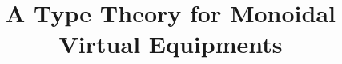\documentclass{article}
\begin{document}
\newcommand{\equalizeVofWbyXeqYatZ}[5]{\{ {#1} : {#2} \pipe {#3} = {#4} : {#5} \}}

\newcommand{\paramPresheaf}[1]{\mathcal P^{#1}}
\newcommand{\pmPresheaf}{\paramPresheaf\pm}
\newcommand{\posPresheaf}{\paramPresheaf+}
\newcommand{\negPresheaf}{\paramPresheaf-}
\newcommand{\negPresheafAppPtoX}[2]{#2\in #1}
\newcommand{\posPresheafAppPtoX}[2]{#1 \ni #2}
\newcommand{\negPresheafApp}{\negPresheafAppPtoX}
\newcommand{\posPresheafApp}{\posPresheafAppPtoX}

\newcommand{\graphProf}[3]{\sum_{{#1};{#2}} #3}

\newcommand{\algCtx}{\textrm{Ctx}}
\newcommand{\algSubst}{\textrm{Subst}}
\newcommand{\algTy}{\textrm{Type}}
\newcommand{\algTm}{\textrm{Term}}
\newcommand{\algCat}{\textrm{Cat}}
\newcommand{\algVarr}{\textrm{Functor}}
\newcommand{\algHCtx}{\textrm{ProfCtx}}
\newcommand{\algHSubst}{\textrm{ProfSubst}}
\newcommand{\algHarr}{\textrm{Prof}}
\newcommand{\algTrans}{\textrm{Trans}}
\newcommand{\algElts}{\textrm{Elts}}
\newcommand{\algEltsI}{\textrm{EltsI}}

\newcommand{\algLHom}{\textrm{LHom}}
\newcommand{\algLHomI}{\textrm{LHomI}}
\newcommand{\algLHomE}{\textrm{LHomE}}
\newcommand{\algRHom}{\textrm{RHom}}
\newcommand{\algRHomI}{\textrm{RHomI}}
\newcommand{\algRHomE}{\textrm{RHomE}}

\newcommand{\algUnit}{\textrm{Unit}}
\newcommand{\algUnitI}{\textrm{UnitI}}
\newcommand{\algUnitE}{\textrm{UnitE}}

\newcommand{\algTensor}{\textrm{Tensor}}
\newcommand{\algTensorI}{\textrm{TensorI}}
\newcommand{\algTensorE}{\textrm{TensorE}}

\newcommand{\algCatTy}{\textrm{Cat}}
\newcommand{\algCatQt}{\textrm{CatQt}}
\newcommand{\algCatUnqt}{\textrm{CatUnQt}}

\newcommand{\algTransTy}{\textrm{Trans}}
\newcommand{\algTransQt}{\textrm{TransQt}}
\newcommand{\algTransUnqt}{\textrm{TransUnQt}}

\newcommand{\algVarrQt}{\textrm{FunctQt}}
\newcommand{\algVarrUnqt}{\textrm{FunctUnQt}}

\newcommand{\quoth}[1]{\lceil{} {#1}\rceil{}}
\newcommand{\unquoth}[1]{\lfloor{} {#1}\rfloor{}}

\newcommand{\postfixop}{\,\,\mathrm{op}}

\newcommand{\citet}[1]{\cite{#1}}
\newcommand{\citep}[1]{(\cite{#1})}

\title{A Type Theory for Monoidal Virtual Equipments}
\end{document}
